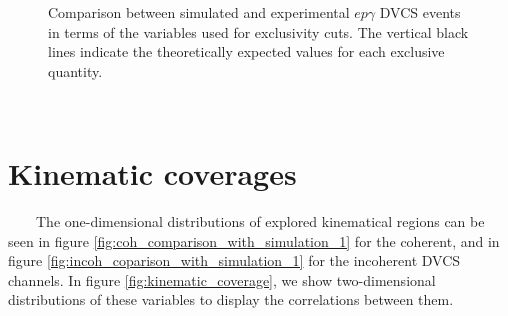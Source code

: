 \begin{figure}[h!]
\caption{Comparison between simulated and experimental $ep\gamma$ DVCS events 
in terms of the variables used for exclusivity cuts. The vertical black lines 
indicate the theoretically expected values for each exclusive quantity.} 
\label{fig:incoh_comparison_with_simulation_exclusive_2}
\end{figure}

~\newpage
~\newpage
\section{Kinematic coverages}
~~~~The one-dimensional distributions of explored kinematical regions can be 
seen in figure \ref{fig:coh_comparison_with_simulation_1} for the coherent, and 
in figure \ref{fig:incoh_coparison_with_simulation_1} for the incoherent DVCS 
channels. In figure \ref{fig:kinematic_coverage}, we show two-dimensional 
distributions of these variables to display the correlations between them. 

